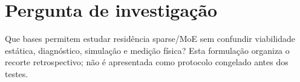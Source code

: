 \clearpage
\section{Pergunta de investigação}
Que bases permitem estudar residência sparse/MoE sem confundir viabilidade estática, diagnóstico, simulação e medição física? Esta formulação organiza o recorte retrospectivo; não é apresentada como protocolo congelado antes dos testes.


